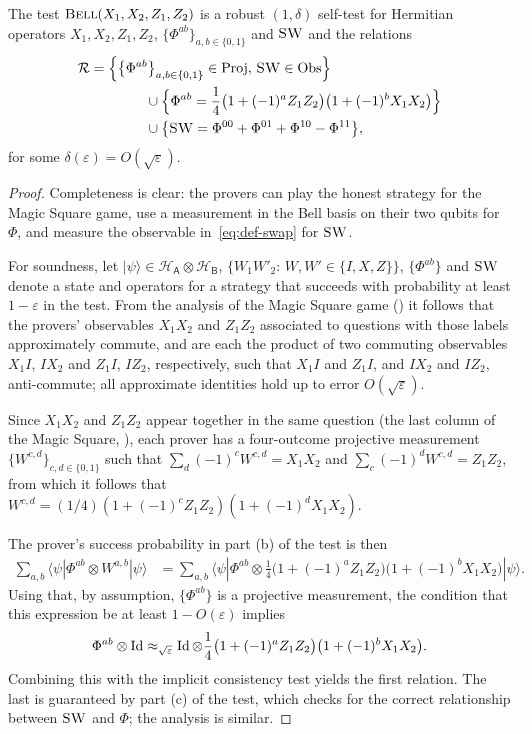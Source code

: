 \documentclass{toc}
\newcommand{\ket}[1]{|#1\rangle}
\newcommand{\bra}[1]{\langle#1|}
\newcommand{\Id}{\ensuremath{\mathop{\rm Id}\nolimits}}
\newcommand{\setft}[1]{\mathrm{#1}}
\newcommand{\Proj}{\setft{Proj}}
\newcommand{\Obs}{\setft{Obs}}
\newcommand{\reg}[1]{{\textsf{#1}}}
\newcommand{\mH}{\mathcal{H}}
\newcommand{\eps}{\varepsilon}
\newcommand{\bellt}{\textsc{Bell}}
\newcommand{\SWAP}{\textsc{SW}}
\begin{document}
\begin{lemma}\label{lem:bell-rigid-test}
The test $\bellt(X_1,X_2,Z_1,Z_2)$ is a robust $(1,\delta)$ self-test for Hermitian operators $X_1,X_2,Z_1,Z_2$, $\{ \Phi^{ab}\}_{a,b\in\{0,1\}}$ and $\SWAP$ and the relations 
\begin{align*}
\mathcal{R}&= \Big\{\big\{\Phi^{ab}\big\}_{a,b\in\{0,1\}}\in\Proj,\,
  \SWAP\in\Obs\Big\}\\
  &\qquad\qquad\cup \Big\{\Phi^{ab} = \frac{1}{4}\big(1+(-1)^a Z_1Z_2\big)\big(1+(-1)^bX_1X_2\big) \Big\}\\
&\qquad\qquad \cup \big\{\SWAP = \Phi^{00}+\Phi^{01}+\Phi^{10}-\Phi^{11}\big\},
\end{align*}
 for some $\delta(\eps) = O(\sqrt{\eps})$.
\end{lemma}


\begin{proof}
Completeness is clear: the provers can play the honest strategy for the Magic Square game, use a measurement in the Bell basis on their two qubits for $\Phi$, and measure the  observable in~\eqref{eq:def-swap} for $\SWAP$. 

For soundness, let $\ket{\psi}\in\mH_\reg{A}\otimes \mH_\reg{B}$, $\{W_1W'_2:\, W,W'\in\{I,X,Z\}\}$, $\{\Phi^{ab}\}$ and $\SWAP$ denote a state and operators for a strategy that succeeds with probability at least $1-\eps$ in the test. From the analysis of the Magic Square game () it follows that the provers' observables $X_1X_2$ and $Z_1Z_2$ associated to questions with those  labels approximately commute, and are each the product of two commuting observables $X_1I$, $IX_2$ and $Z_1I$, $IZ_2$, %
 respectively, such that $X_1I$ and $Z_1I$, and $IX_2$ and $IZ_2$, anti-commute; all approximate identities hold up to error $O(\sqrt{\eps})$. 

Since $X_1X_2$ and $Z_1Z_2$ appear together in the same question (the last column of the Magic Square, ), each prover has a four-outcome projective measurement $\{W^{c,d}\}_{c,d\in\{0,1\}}$ such that $\sum_d (-1)^c W^{c,d} = X_1X_2$ and $\sum_c (-1)^dW^{c,d} = Z_1Z_2$, from which it follows that $W^{c,d} = (1/4)(1+(-1)^c Z_1Z_2)(1+(-1)^d X_1X_2)$. 

The prover's success probability in part (b) of the test is then
\begin{align*}
\sum_{a,b} \bra{\psi} \Phi^{ab} \otimes W^{a,b} \ket{\psi} &= \sum_{a,b} \bra{\psi} \Phi^{ab} \otimes \frac{1}{4} \big(1+(-1)^a Z_1Z_2\big)\big(1+(-1)^bX_1X_2\big) \ket{\psi}.
\end{align*}
Using that, by assumption, $\{\Phi^{ab}\}$ is a projective measurement, the condition that this expression be at least $1-O(\eps)$ implies 
$$\Phi^{ab} \otimes \Id \approx_{\sqrt{\eps}}\Id \otimes \frac{1}{4}\big(1+(-1)^a Z_1Z_2\big)\big(1+(-1)^bX_1X_2\big).$$ 
Combining this with the implicit consistency test yields the first relation. The last is guaranteed by part (c) of the test, which checks for the correct relationship between $\SWAP$ and $\Phi$; the analysis is similar.  
\end{proof}
\end{document}
